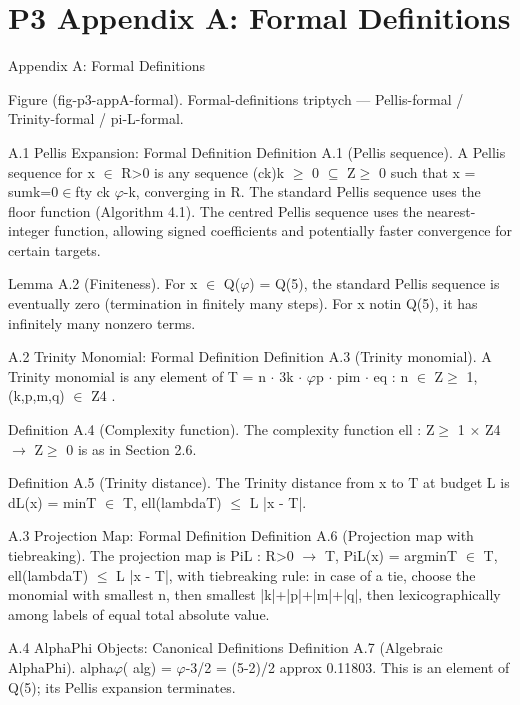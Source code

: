 
\section{P3 Appendix A: Formal Definitions}

Appendix A: Formal Definitions

            Figure (fig-p3-appA-formal). Formal-definitions triptych --- Pellis-formal / Trinity-formal /
                                                 pi-L-formal.

  A.1 Pellis Expansion: Formal Definition
  Definition A.1 (Pellis sequence). A Pellis sequence for x $\in$ R>0 is any sequence (ck)k $\geq$
  0 $\subseteq$ Z$\geq$ 0 such that x = sumk=0$\in$fty ck $\varphi$-k, converging in R. The standard Pellis
  sequence uses the floor function (Algorithm 4.1). The centred Pellis sequence uses the
  nearest-integer function, allowing signed coefficients and potentially faster
  convergence for certain targets.

  Lemma A.2 (Finiteness). For x $\in$ Q($\varphi$) = Q(5), the standard Pellis sequence is eventually
  zero (termination in finitely many steps). For x notin Q(5), it has infinitely many nonzero
  terms.

  A.2 Trinity Monomial: Formal Definition
  Definition A.3 (Trinity monomial). A Trinity monomial is any element of T = { n $\cdot$ 3k $\cdot$ $\varphi$p
  $\cdot$ pim $\cdot$ eq : n $\in$ Z$\geq$ 1, (k,p,m,q) $\in$ Z4 }.

  Definition A.4 (Complexity function). The complexity function ell : Z$\geq$ 1 $\times$ Z4 $\rightarrow$ Z$\geq$ 0 is
  as in Section 2.6.

  Definition A.5 (Trinity distance). The Trinity distance from x to T at budget L is dL(x) =
  minT $\in$ T, ell(lambdaT) $\leq$ L |x - T|.

  A.3 Projection Map: Formal Definition
  Definition A.6 (Projection map with tiebreaking). The projection map is PiL : R>0 $\rightarrow$ T,
  PiL(x) = argminT $\in$ T, ell(lambdaT) $\leq$ L |x - T|, with tiebreaking rule: in case of a tie,
  choose the monomial with smallest n, then smallest |k|+|p|+|m|+|q|, then
  lexicographically among labels of equal total absolute value.

  A.4 AlphaPhi Objects: Canonical Definitions
  Definition A.7 (Algebraic AlphaPhi). alpha$\varphi$( alg) = $\varphi$-3/2 = (5-2)/2 approx 0.11803. This
  is an element of Q(5); its Pellis expansion terminates.

